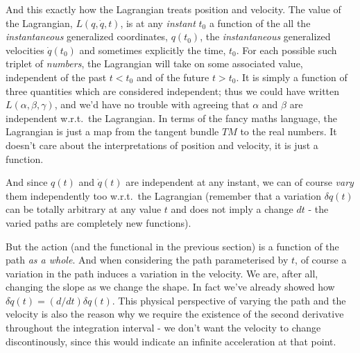 \documentclass[a4paper]{article}
\begin{document}
    And this exactly how the Lagrangian treats position and velocity. The value of the Lagrangian, \(L(q, \dot{q}, t)\), is at any \textit{instant} \(t_0\) a function of the all the \textit{instantaneous} generalized coordinates, \(q(t_0)\), the \textit{instantaneous} generalized velocities \(\dot{q}(t_0)\) and sometimes explicitly the time, \(t_0\). For each possible such triplet of \textit{numbers}, the Lagrangian will take on some associated value, independent of the past \(t < t_0\) and of the future \(t > t_0\). It is simply a function of three quantities which are considered independent; thus we could have written \(L(\alpha, \beta, \gamma)\), and we'd have no trouble with agreeing that \(\alpha\) and \(\beta\) are independent w.r.t.\ the Lagrangian. In terms of the fancy maths language, the Lagrangian is just a map from the tangent bundle \(TM\) to the real numbers. It doesn't care about the interpretations of position and velocity, it is just a function. 
    
    And since \(q(t)\) and \(\dot{q}(t)\) are independent at any instant, we can of course \textit{vary} them independently too w.r.t.\ the Lagrangian (remember that a variation \(\delta q(t)\) can be totally arbitrary at any value \(t\) and does not imply a change \(dt\) - the varied paths are completely new functions).

    But the action (and the functional in the previous section) is a function of the path \textit{as a whole}. And when considering the path parameterised by \(t\), of course a variation in the path induces a variation in the velocity. We are, after all, changing the slope as we change the shape. In fact we've already showed how \(\delta \dot{q} (t) = (d / dt)\delta q(t)\). This physical perspective of varying the path and the velocity is also the reason why we require the existence of the second derivative throughout the integration interval - we don't want the velocity to change discontinously, since this would indicate an infinite acceleration at that point.
    
\end{document}
